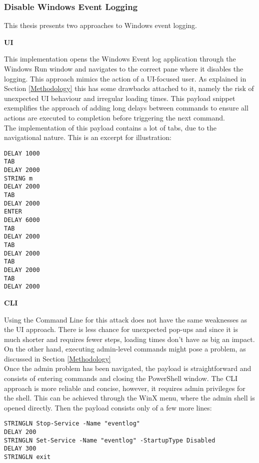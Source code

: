 \subsubsection{Disable Windows Event Logging}

This thesis presents two approaches to Windows event logging.

\textbf{UI} 

This implementation opens the Windows Event log application through the Windows Run window and navigates to the correct pane where it disables the logging.
This approach mimics the action of a UI-focused user. As explained in Section \ref{Methodology} this has some drawbacks attached to it, namely the risk of unexpected UI behaviour and irregular loading times. This payload snippet exemplifies the approach of adding long delays between commands to ensure all actions are executed to completion before triggering the next command.\\
The implementation of this payload contains a lot of tabs, due to the navigational nature. This is an excerpt for illustration:

\begin{lstlisting}[caption={Exceprt: disable Windows Event Logging by navigating UI}, captionpos=b]
DELAY 1000
TAB
DELAY 2000
STRING m
DELAY 2000
TAB
DELAY 2000
ENTER
DELAY 6000
TAB
DELAY 2000
TAB
DELAY 2000
TAB
DELAY 2000
TAB
DELAY 2000
\end{lstlisting}

\textbf{CLI}

Using the Command Line for this attack does not have the same weaknesses as the UI approach. There is less chance for unexpected pop-ups and since it is much shorter and requires fewer steps, loading times don't have as big an impact. On the other hand, executing admin-level commands might pose a problem, as discussed in Section \ref{Methodology} \\

Once the admin problem has been navigated, the payload is straightforward and consists of entering commands and closing the PowerShell window.
The CLI approach is more reliable and concise, however, it requires admin privileges for the shell. This can be achieved through the WinX menu, where the admin shell is opened directly. Then the payload consists only of a few more lines:

\begin{lstlisting}[caption={Exceprt: disable Windows Event Logging through PowerShell}, captionpos=b]
STRINGLN Stop-Service -Name "eventlog"
DELAY 200
STRINGLN Set-Service -Name "eventlog" -StartupType Disabled
DELAY 300
STRINGLN exit
\end{lstlisting}


